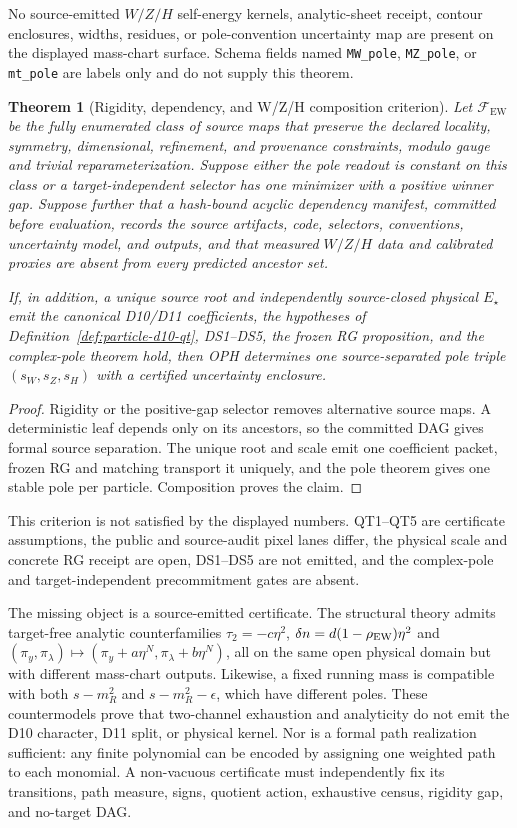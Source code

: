 \documentclass[11pt]{article}
\newtheorem{theorem}{Theorem}[section]
\begin{document}
No source-emitted \(W/Z/H\) self-energy kernels, analytic-sheet receipt,
contour enclosures, widths, residues, or pole-convention uncertainty map are
present on the displayed mass-chart surface. Schema fields named
\texttt{MW\_pole}, \texttt{MZ\_pole}, or \texttt{mt\_pole} are labels only and do not
supply this theorem.

\begin{theorem}[Rigidity, dependency, and W/Z/H composition criterion]
Let \(\mathcal F_{\mathrm{EW}}\) be the fully enumerated class of source maps
that preserve the declared locality, symmetry, dimensional, refinement, and
provenance constraints, modulo gauge and trivial reparameterization.  Suppose
either the pole readout is constant on this class or a target-independent
selector has one minimizer with a positive winner gap.  Suppose further that
a hash-bound acyclic dependency manifest, committed before evaluation, records
the source artifacts, code, selectors, conventions, uncertainty model, and
outputs, and that measured \(W/Z/H\) data and calibrated proxies are absent
from every predicted ancestor set.

If, in addition, a unique source root and independently source-closed physical
\(E_\star\) emit the canonical D10/D11 coefficients, the hypotheses of
Definition~\ref{def:particle-d10-qt}, DS1--DS5, the frozen RG proposition, and the
complex-pole theorem hold, then OPH determines one source-separated pole
triple \((s_W,s_Z,s_H)\) with a certified uncertainty enclosure.
\end{theorem}

\begin{proof}
Rigidity or the positive-gap selector removes alternative source maps.  A
deterministic leaf depends only on its ancestors, so the committed DAG gives
formal source separation.  The unique root and scale emit one coefficient
packet, frozen RG and matching transport it uniquely, and the pole theorem
gives one stable pole per particle.  Composition proves the claim.
\end{proof}

This criterion is not satisfied by the displayed numbers. QT1--QT5 are
certificate assumptions, the public and source-audit pixel lanes differ, the
physical scale and concrete RG receipt are open, DS1--DS5 are not emitted, and
the complex-pole and target-independent precommitment gates are absent.

The missing object is a source-emitted certificate.
The structural theory admits target-free analytic counterfamilies
\(\tau_2=-c\eta^2\), \(\delta n=d(1-\rho_{\rm EW})\eta^2\) and
\((\pi_y,\pi_\lambda)\mapsto(\pi_y+a\eta^N,
\pi_\lambda+b\eta^N)\), all on the same open physical domain but with
different mass-chart outputs. Likewise, a fixed running mass is compatible
with both $s-m_R^2$ and $s-m_R^2-\epsilon$, which have different poles.
These countermodels prove that two-channel exhaustion and analyticity do not
emit the D10 character, D11 split, or physical kernel. Nor is a formal path
realization sufficient: any finite polynomial can be encoded by assigning one
weighted path to each monomial. A non-vacuous certificate must independently
fix its transitions, path measure, signs, quotient action, exhaustive census,
rigidity gap, and no-target DAG.
\end{document}
